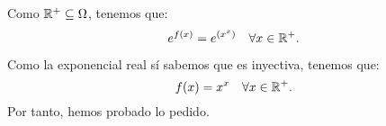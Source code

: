 \begin{ejercicio}
    Como $\mathbb{R}^+ \subseteq \Omega$, tenemos que:
    \begin{equation*}
        e^{f(x)} = e^{\left(x^x\right)}
        \quad \forall x \in \mathbb{R}^+.
    \end{equation*}

    Como la exponencial real sí sabemos que es inyectiva, tenemos que:
    \begin{equation*}
        f(x) = x^x
        \quad \forall x \in \mathbb{R}^+.
    \end{equation*}
    Por tanto, hemos probado lo pedido.
\end{ejercicio}